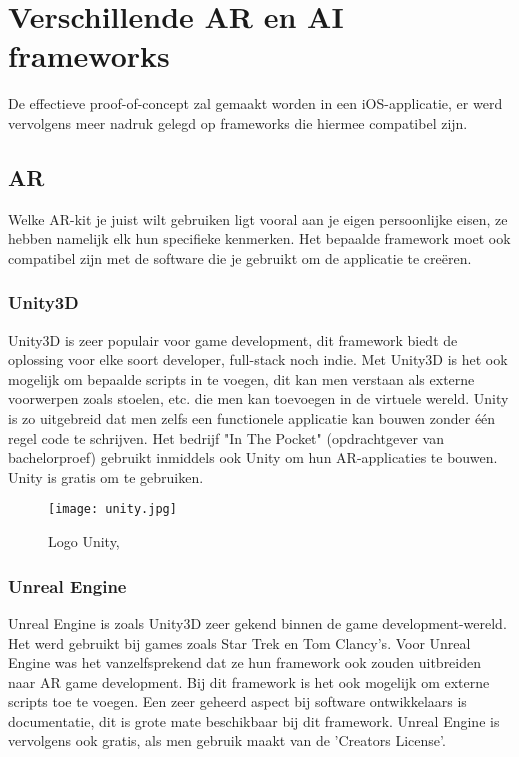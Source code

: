 \section{Verschillende AR en AI frameworks}

De effectieve proof-of-concept zal gemaakt worden in een iOS-applicatie, er werd vervolgens meer nadruk gelegd op frameworks die hiermee compatibel zijn.
\subsection{AR}
Welke AR-kit je juist wilt gebruiken ligt vooral aan je eigen persoonlijke eisen, ze hebben namelijk elk hun specifieke kenmerken. Het bepaalde framework moet ook compatibel zijn met de software die je gebruikt om de applicatie te creëren.
\subsubsection{Unity3D}
Unity3D is zeer populair voor game development, dit framework biedt de oplossing voor elke soort developer, full-stack noch indie. Met Unity3D is het ook mogelijk om bepaalde scripts in te voegen, dit kan men verstaan als externe voorwerpen zoals stoelen, etc. die men kan toevoegen in de virtuele wereld. Unity is zo uitgebreid dat men zelfs een functionele applicatie kan bouwen zonder één regel code te schrijven. Het bedrijf "In The Pocket" (opdrachtgever van bachelorproef) gebruikt inmiddels ook Unity om hun AR-applicaties te bouwen. Unity is gratis om te gebruiken. \autocite{Arshed2018}

\begin{figure}[H]
	\centering
	\texttt{[image: unity.jpg]}
	\caption{Logo Unity, \autocite{Unity2019}}
\end{figure}

\subsubsection{Unreal Engine}
Unreal Engine is zoals Unity3D zeer gekend binnen de game development-wereld. Het werd gebruikt bij games zoals Star Trek en Tom Clancy's. Voor Unreal Engine was het vanzelfsprekend dat ze hun framework ook zouden uitbreiden naar 	AR game development. Bij dit framework is het ook mogelijk om externe scripts toe te voegen. Een zeer geheerd aspect bij software ontwikkelaars is documentatie, dit is grote mate beschikbaar bij dit framework. Unreal Engine is vervolgens ook gratis, als men gebruik maakt van de 'Creators License'.  \autocite{Arshed2018}

